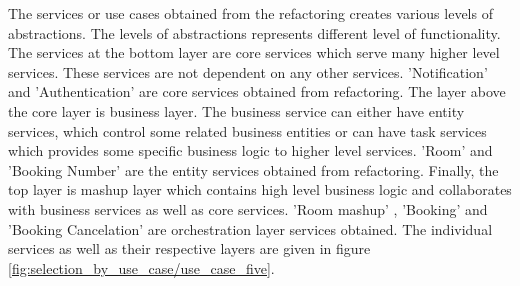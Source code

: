 The services or use cases obtained from the refactoring creates various levels of abstractions. The levels of abstractions represents different level of functionality. The services at the bottom layer are core services which serve many higher level services. These services are not dependent on any other services. 'Notification' and 'Authentication' are core services obtained from refactoring. The layer above the core layer is business layer. The business service can either have entity services, which control some related business entities or can have task services which provides some specific business logic to higher level services. 'Room' and 'Booking Number' are the entity services obtained from refactoring. Finally, the top layer is mashup layer which contains high level business logic and collaborates with business services as well as core services. 'Room mashup' , 'Booking' and 'Booking Cancelation' are orchestration layer services obtained. The individual services as well as their respective layers are given in figure \ref{fig:selection_by_use_case/use_case_five}. \cite{Fareghzadeh:2008aa}\cite{Emig:2015aa}\cite{Zimmermann:2005aa}
